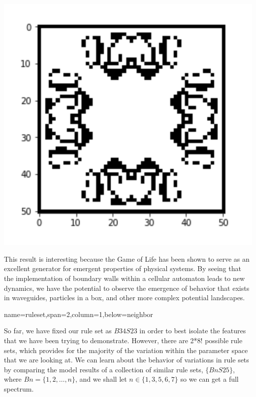 \documentclass[a0paper,portrait]{baposter}
\begin{document}
\begin{poster}
{	\centering
	\includegraphics[width=0.4\linewidth]{ConfinedSnapshot}
	
	This result is interesting because the Game of Life has been shown to serve as an excellent generator for emergent properties of physical systems. By seeing that the implementation of boundary walls within a cellular automaton leads to new dynamics, we have the potential to observe the emergence of behavior that exists in waveguides, particles in a box, and other more complex potential landscapes.

	
	
	
	
	
}

{name=ruleset,span=2,column=1,below=neighbor}{
So far, we have fixed our rule set as $B34S23$ in order to best isolate the features that we have been trying to demonstrate. However, there are 2*8! possible rule sets, which provides for the majority of the variation within the parameter space that we are looking at. We can learn about the behavior of variations in rule sets by comparing the model results of a collection of similar rule sets, $\{BnS25\}$, where $Bn = \{1,2,\dots, n\}$, and we shall let $n\in \{1,3,5,6,7\}$ so we can get a full spectrum. 

}
\end{poster}
\end{document}
